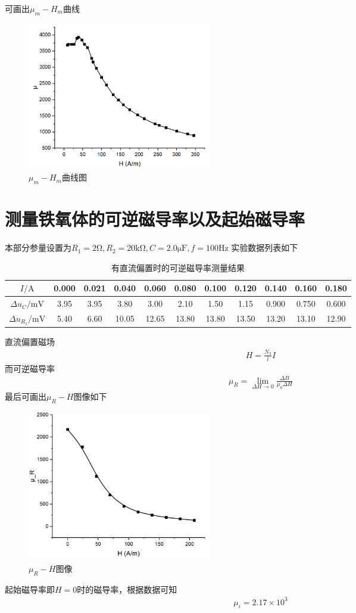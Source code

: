 \documentclass{ctexart}
\begin{document}
	可画出$\mu_m-H_m$曲线
	\begin{figure}[H]
		\centering
		\includegraphics[width=8cm]{2.png}
		\caption{$\mu_m-H_m$曲线图}
	\end{figure}
	\section{测量铁氧体的可逆磁导率以及起始磁导率}
	本部分参量设置为$R_1=2\mathrm{\Omega},R_2=20\mathrm{k\Omega},C=2.0\mathrm{\mu F},f=100\mathrm{Hz}$
	实验数据列表如下
	\begin{table}[H]
		\begin{center}
			\caption{有直流偏置时的可逆磁导率测量结果}
			\begin{tabular}{c|cccccccccc}
				$I/\mathrm{A}$&0.000&0.021&0.040&0.060&0.080&0.100&0.120&0.140&0.160&0.180\\\hline
				$\Delta u_C/\mathrm{mV}$&3.95&3.95&3.80&3.00&2.10&1.50&1.15&0.900&0.750&0.600\\\hline
				$\Delta u_{R_1}/\mathrm{mV}$&5.40&6.60&10.05&12.65&13.80&13.80&13.50&13.20&13.10&12.90
			\end{tabular}
		\end{center}
	\end{table}
	直流偏置磁场
	\begin{align}
		H=\frac{N_3}{l}I
	\end{align}
	而可逆磁导率
	\begin{align}
		\mu_R=\lim_{\Delta H\rightarrow0}\frac{\Delta B}{\mu_0 \Delta H}
	\end{align}
	最后可画出$\mu_R-H$图像如下
	\begin{figure}[H]
		\centering
		\includegraphics[width=8cm]{3.png}
		\caption{$\mu_R-H$图像}
	\end{figure}
	起始磁导率即$H=0$时的磁导率，根据数据可知
	\begin{align}
		\mu_i=2.17\times10^3
	\end{align}
\end{document}
